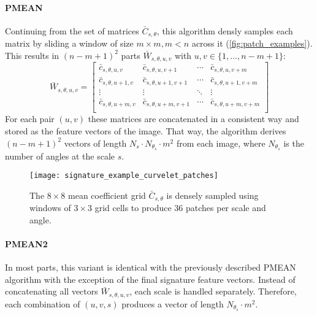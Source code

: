 \paragraph{PMEAN}

Continuing from the set of matrices $\bar{C}_{s, \theta}$, this algorithm
densly samples each matrix by sliding a window of size $m \times m, m < n$
across it (\autoref{fig:patch_examples}). This results in $(n - m + 1)^2$ parts
$\bar{W}_{s, \theta, u, v}$ with $u, v \in \{1, \dots, n - m + 1\}$:
\begin{equation*}
    \bar{W}_{s,\theta,u,v} =
    \begin{bmatrix}
        \bar{c}_{s,\theta,u,v} & \bar{c}_{s,\theta,u,v+1} & \cdots & \bar{c}_{s,\theta,u,v+m} \\
        \bar{c}_{s,\theta,u+1,v} & \bar{c}_{s,\theta,u+1,v+1} & \cdots & \bar{c}_{s,\theta,u+1,v+m} \\
        \vdots  & \vdots  & \ddots & \vdots  \\
        \bar{c}_{s,\theta,u+m,v} & \bar{c}_{s,\theta,u+m,v+1} & \cdots & \bar{c}_{s,\theta,u+m,v+m} \\
    \end{bmatrix}
\end{equation*}
For each pair $(u, v)$ these matrices are concatenated in a consistent way and
stored as the feature vectors of the image. That way, the algorithm derives $(n
- m + 1)^2$ vectors of length $N_s \cdot N_{\theta_s} \cdot m^2$ from each
image, where $N_{\theta_s}$ is the number of angles at the scale $s$.

\begin{figure}[h]
    \centering
    \texttt{[image: signature\_example\_curvelet\_patches]}%
    \caption[Patches on a coefficient grid]{
        The $8 \times 8$ mean coefficient grid $\bar{C}_{s, \theta}$ is densely
        sampled using windows of $3 \times 3$ grid cells to produce $36$
        patches per scale and angle.
    }
    \label{fig:patch_examples}
\end{figure}

\paragraph{PMEAN2}

In most parts, this variant is identical with the previously described PMEAN
algorithm with the exception of the final signature feature vectors. Instead of
concatenating all vectors $\bar{W}_{s, \theta, u, v}$, each scale is handled
separately. Therefore, each combination of $(u, v, s)$ produces a vector of
length $N_{\theta_s} \cdot m^2$.

